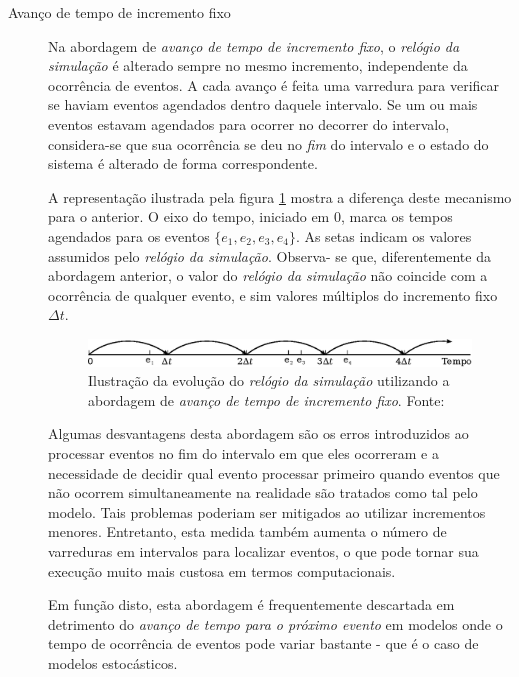 \begin{description}
\item[Avanço de tempo de incremento fixo] \hfill

Na abordagem de \textit{avanço de tempo de incremento fixo}, o \textit{relógio
da simulação} é alterado sempre no mesmo incremento, independente da ocorrência
de eventos. A cada avanço é feita uma varredura para verificar se haviam eventos
agendados dentro daquele intervalo. Se um ou mais eventos estavam agendados para
ocorrer no decorrer do intervalo, considera-se que sua ocorrência se deu no
\textit{fim} do intervalo e o estado do sistema é alterado de forma
correspondente.

A representação ilustrada pela figura \ref{fig:fixedtime} mostra a diferença
deste mecanismo para o anterior. O eixo do tempo, iniciado em 0, marca os tempos
agendados para os eventos $\{e_{1}, e_{2}, e_{3}, e_{4}\}$. As
setas indicam os valores assumidos pelo \textit{relógio da simulação}. Observa-
se que, diferentemente da abordagem anterior, o valor do \textit{relógio da
simulação} não coincide com a ocorrência de qualquer evento, e sim valores
múltiplos do incremento fixo $\Delta t$.

\begin{figure}[htb!]
\centering\includegraphics{img/fixed.eps}
\caption{\label{fig:fixedtime}Ilustração da evolução do \textit{relógio da simulação} utilizando a abordagem de \textit{avanço de tempo de incremento fixo}. Fonte:~\cite{Law}}
\end{figure}

Algumas desvantagens desta abordagem são os erros introduzidos ao processar
eventos no fim do intervalo em que eles ocorreram e a necessidade de decidir
qual evento processar primeiro quando eventos que não ocorrem simultaneamente na
realidade são tratados como tal pelo modelo. Tais problemas poderiam ser
mitigados ao utilizar incrementos menores. Entretanto, esta medida também
aumenta o número de varreduras em intervalos para localizar eventos, o que pode
tornar sua execução muito mais custosa em termos computacionais.

Em função disto, esta abordagem é frequentemente descartada em detrimento do
\textit{avanço de tempo para o próximo evento} em modelos onde o tempo de
ocorrência de eventos pode variar bastante - que é o caso de modelos
estocásticos.

\end{description}


